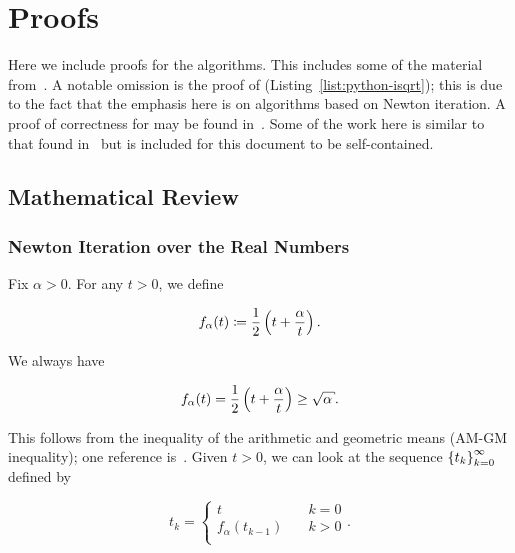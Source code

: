 \section{Proofs}
\label{app:proofs}

Here we include proofs for the algorithms.
This includes some of the material from~\cite[Appendix B]{EfficientIsqrt}.
A notable omission is the proof of
\python{} (Listing~\ref{list:python-isqrt});
this is due to the fact that the emphasis here is on algorithms
based on Newton iteration.
A proof of correctness for \python{}
may be found in~\cite[Appendix C]{EfficientIsqrt}.
Some of the work here is similar to that found
in~\cite[Appendix A]{EfficientIsqrt}
but is included for this document to be self-contained.


\subsection{Mathematical Review}

\subsubsection{Newton Iteration over the Real Numbers}

Fix $\alpha>0$.
For any $t>0$, we define

\begin{equation}
    f_{\alpha}(t) \coloneqq{} \frac{1}{2}\left( t + \frac{\alpha}{t} \right).
\end{equation}

\noindent
We always have

\begin{equation}
    f_{\alpha}(t) = \frac{1}{2}\parens{t + \frac{\alpha}{t}} \ge \sqrt{\alpha}.
\end{equation}

\noindent
This follows from the inequality of the arithmetic and geometric means
(AM-GM inequality); one reference is~\cite[Page 20]{CSMaster}.
Given $t>0$, we can look at the sequence $\left\{ t_{k} \right\}_{k=0}^{\infty}$
defined by

\begin{equation}
    t_{k} = \begin{cases}
        t \quad &k=0 \\
        f_{\alpha}(t_{k-1}) \quad &k>0 \\
    \end{cases}.
    \label{eq:app:proof:newton_seq}
\end{equation}


